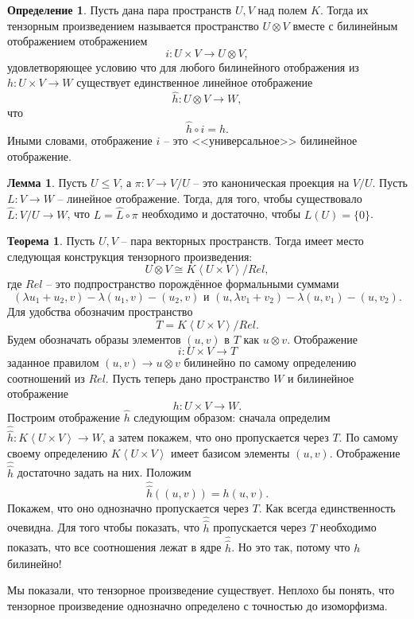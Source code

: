 \documentclass[10pt,a4paper,oneside]{book}
\theoremstyle{definition}
\newtheorem*{defn}{\color{yellow!30!red} Определение}
\newtheorem{thm}{\color{red!40!black}Теорема}
\newtheorem{lem}{\color{green!50!black}Лемма}
\renewcommand{\leq}{\leqslant}
\def\lan{\left\langle }
\def\ran{\right\rangle}
\def\thrm{\begin{thm}}
\def\ethrm{\end{thm}}
\def\dfn{\begin{defn}}
\def\edfn{\end{defn}}
\def\lm{\begin{lem}}
\def\elm{\end{lem}}
\begin{document}
\dfn Пусть дана пара пространств $U,V$ над полем $K$. Тогда их тензорным произведением называется пространство 
$U\otimes V$ вместе с билинейным отображением отображением
$$i \colon U \times  V \to U \otimes V,$$
удовлетворяющее условию что для любого билинейного отображения из $h\colon U \times V \to W$ существует единственное линейное отображение 
$$\hat{h}\colon U\otimes V \to W,$$
что 
$$\hat{h}\circ i=h.$$
Иными словами, отображение $i$ -- это <<универсальное>> билинейное отображение.
\edfn 


\lm Пусть $U\leq V$, а $\pi \colon V \to V/U$ -- это каноническая проекция на $V/U$. Пусть $L\colon V \to W$ -- линейное отображение. Тогда, для того, чтобы существовало $\hat{L}\colon V/U \to W$, что $L=\hat{L}\circ \pi$ необходимо и достаточно, чтобы $L(U)=\{0\}$.
\elm





\thrm Пусть $U,V$ -- пара векторных пространств. Тогда имеет место следующая конструкция тензорного произведения:
$$U \otimes V \cong K\lan U \times V \ran / Rel,$$
где $Rel$ -- это подпространство порождённое формальными суммами
$$(\lambda u_1+u_2, v) - \lambda (u_1, v) - ( u_2,v) \text{ и } (u,\lambda v_1+v_2) - \lambda (u,v_1) - (u,v_2).$$ 
\proof Для удобства обозначим пространство
$$T=K\lan U \times V \ran / Rel.$$ Будем обозначать образы элементов $(u,v)$ в $T$ как  $u\otimes v$. Отображение $$i \colon U\times V \to T$$
заданное правилом  $(u,v) \to u \otimes v$
билинейно по самому определению соотношений из $Rel$. Пусть теперь дано пространство $W$ и билинейное отображение $$h \colon U \times V \to W.$$
Построим отображение $\hat{h}$ следующим образом: сначала определим $\hat{\hat{h}}\colon K\lan U \times V \ran \to W$, а затем покажем, что оно пропускается через $T$. По самому своему определению $K\lan U \times V\ran$ имеет базисом элементы $(u,v)$. Отображение $\hat{\hat{h}}$ достаточно задать на них. Положим $$\hat{\hat{h}}((u,v))=h(u,v).$$
Покажем, что оно однозначно пропускается через $T$. Как всегда единственность очевидна. Для того чтобы показать, что $\hat{\hat{h}}$ пропускается через $T$ необходимо показать, что все соотношения лежат в ядре $\hat{\hat{h}}$. Но это так, потому что $h$ билинейно! 
\endproof
\ethrm




Мы показали, что тензорное произведение существует. Неплохо бы понять, что тензорное произведение однозначно определено с точностью до изоморфизма. 
\end{document}
